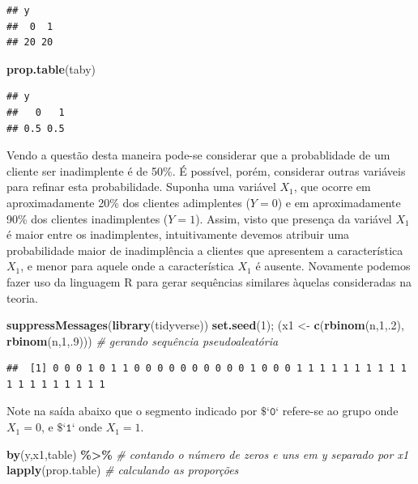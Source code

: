 \documentclass[
]{book}
\newenvironment{Shaded}{\begin{snugshade}}{\end{snugshade}}
\newcommand{\CommentTok}[1]{\textcolor[rgb]{0.56,0.35,0.01}{\textit{#1}}}
\newcommand{\DecValTok}[1]{\textcolor[rgb]{0.00,0.00,0.81}{#1}}
\newcommand{\KeywordTok}[1]{\textcolor[rgb]{0.13,0.29,0.53}{\textbf{#1}}}
\newcommand{\NormalTok}[1]{#1}
\newcommand{\OperatorTok}[1]{\textcolor[rgb]{0.81,0.36,0.00}{\textbf{#1}}}
\newcommand{\StringTok}[1]{\textcolor[rgb]{0.31,0.60,0.02}{#1}}
\theoremstyle{definition}
\theoremstyle{definition}
\theoremstyle{definition}
\theoremstyle{remark}
\begin{document}
\begin{verbatim}
## y
##  0  1 
## 20 20
\end{verbatim}

\begin{Shaded}
\begin{Highlighting}[]
\KeywordTok{prop.table}\NormalTok{(taby)}
\end{Highlighting}
\end{Shaded}

\begin{verbatim}
## y
##   0   1 
## 0.5 0.5
\end{verbatim}

Vendo a questão desta maneira pode-se considerar que a probablidade de um cliente ser inadimplente é de 50\%. É possível, porém, considerar outras variáveis para refinar esta probabilidade. Suponha uma variável \(X_1\), que ocorre em aproximadamente 20\% dos clientes adimplentes (\(Y=0\)) e em aproximadamente 90\% dos clientes inadimplentes (\(Y=1\)). Assim, visto que presença da variável \(X_1\) é maior entre os inadimplentes, intuitivamente devemos atribuir uma probabilidade maior de inadimplência a clientes que apresentem a característica \(X_1\), e menor para aquele onde a característica \(X_1\) é ausente. Novamente podemos fazer uso da linguagem R para gerar sequências similares àquelas consideradas na teoria.

\begin{Shaded}
\begin{Highlighting}[]
\KeywordTok{suppressMessages}\NormalTok{(}\KeywordTok{library}\NormalTok{(tidyverse))}
\KeywordTok{set.seed}\NormalTok{(}\DecValTok{1}\NormalTok{); (x1 \textless{}{-}}\StringTok{ }\KeywordTok{c}\NormalTok{(}\KeywordTok{rbinom}\NormalTok{(n,}\DecValTok{1}\NormalTok{,.}\DecValTok{2}\NormalTok{), }\KeywordTok{rbinom}\NormalTok{(n,}\DecValTok{1}\NormalTok{,.}\DecValTok{9}\NormalTok{)))  }\CommentTok{\# gerando sequência pseudoaleatória}
\end{Highlighting}
\end{Shaded}

\begin{verbatim}
##  [1] 0 0 0 1 0 1 1 0 0 0 0 0 0 0 0 0 0 1 0 0 0 1 1 1 1 1 1 1 1 1 1 1 1 1 1 1 1 1 1 1
\end{verbatim}

Note na saída abaixo que o segmento indicado por \(\texttt{\$}\)`\(\texttt{0}\)` refere-se ao grupo onde \(X_1=0\), e \(\texttt{\$}\)`\(\texttt{1}\)` onde \(X_1=1\).

\begin{Shaded}
\begin{Highlighting}[]
\KeywordTok{by}\NormalTok{(y,x1,table) }\OperatorTok{\%\textgreater{}\%}\StringTok{   }\CommentTok{\# contando o número de zeros e uns em y separado por x1}
\StringTok{  }\KeywordTok{lapply}\NormalTok{(prop.table) }\CommentTok{\# calculando as proporções }
\end{Highlighting}
\end{Shaded}
\end{document}
